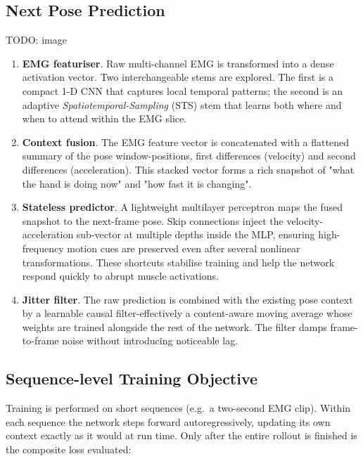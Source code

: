 \subsection{Next Pose Prediction}

TODO: image

\begin{enumerate}[label=\arabic*.]
  \item \textbf{EMG featuriser}.
        Raw multi-channel EMG is transformed into a dense activation vector.
        Two interchangeable stems are explored.
        The first is a compact 1-D CNN that captures local temporal patterns;
        the second is an adaptive \emph{Spatiotemporal-Sampling} (STS) stem that
        learns both where and when to attend within the EMG slice.
  \item \textbf{Context fusion}.
        The EMG feature vector is concatenated with a flattened summary of the
        pose window-positions, first differences (velocity) and second
        differences (acceleration). This stacked vector forms a rich snapshot
        of "what the hand is doing now" and "how fast it is changing".
  \item \textbf{Stateless predictor}.
        A lightweight multilayer perceptron maps the fused snapshot to the
        next-frame pose. Skip connections inject the velocity-acceleration
        sub-vector at multiple depths inside the MLP, ensuring high-frequency
        motion cues are preserved even after several nonlinear transformations.
        These shortcuts stabilise training and help the network respond quickly
        to abrupt muscle activations.
  \item \textbf{Jitter filter}.
        The raw prediction is combined with the existing pose context by a
        learnable causal filter-effectively a content-aware moving average
        whose weights are trained alongside the rest of the network. The
        filter damps frame-to-frame noise without introducing noticeable lag.
\end{enumerate}

\subsection{Sequence-level Training Objective}

Training is performed on short sequences (e.g.\ a two-second EMG clip).
Within each sequence the network steps forward autoregressively, updating its
own context exactly as it would at run time. Only after the entire rollout is
finished is the composite loss evaluated:

